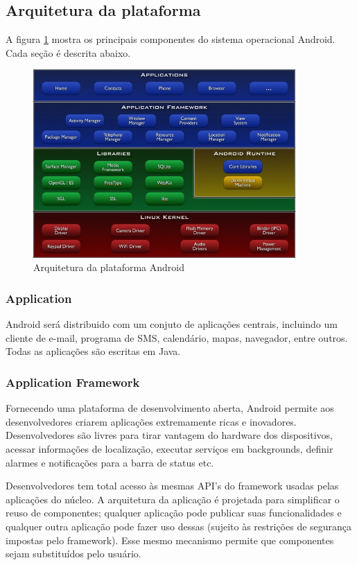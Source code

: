\subsection{Arquitetura da plataforma}

A figura \ref{system-architecture} mostra os principais componentes do sistema 
operacional Android. Cada seção é descrita abaixo.

\begin{figure}[h]
    \centering
    \includegraphics[width=10cm]{img/system-architecture.jpg}
    \caption{Arquitetura da plataforma Android}
    \label{system-architecture}
\end{figure}

\subsubsection{Application}
Android será distribuido com um conjuto de aplicações centrais, incluindo um cliente
de e-mail, programa de SMS, calendário, mapas, navegador, entre outros. Todas as 
aplicações são escritas em Java.

\subsubsection{Application Framework}
Fornecendo uma plataforma de desenvolvimento aberta, Android permite aos desenvolvedores
criarem aplicações extremamente ricas e inovadores. Desenvolvedores são livres para
tirar vantagem do hardware dos dispositivos, acessar informações de localização, 
executar serviços em backgrounds, definir alarmes e notificações para a barra de 
status etc.

Desenvolvedores tem total acesso às mesmas API's do framework usadas pelas aplicações 
do núcleo. A arquitetura da aplicação é projetada para simplificar o reuso de componentes;
qualquer aplicação pode publicar suas funcionalidades e qualquer outra aplicação pode 
fazer uso dessas (sujeito às restrições de segurança impostas pelo framework). Esse mesmo
mecanismo permite que componentes sejam substituídos pelo usuário.

